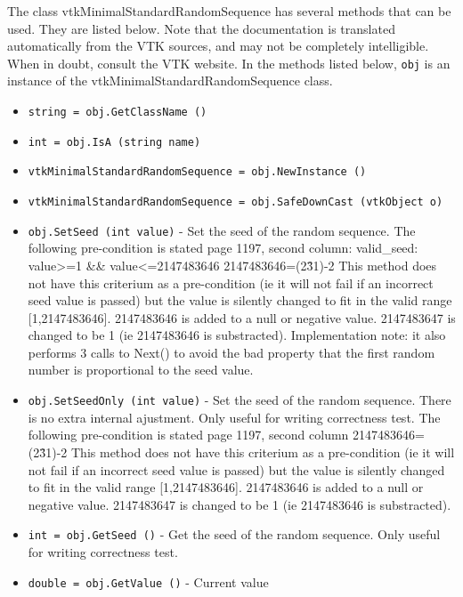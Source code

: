 The class vtkMinimalStandardRandomSequence has several methods that can be used.
  They are listed below.
Note that the documentation is translated automatically from the VTK sources,
and may not be completely intelligible.  When in doubt, consult the VTK website.
In the methods listed below, \verb|obj| is an instance of the vtkMinimalStandardRandomSequence class.
\begin{itemize}
\item  \verb|string = obj.GetClassName ()|

\item  \verb|int = obj.IsA (string name)|

\item  \verb|vtkMinimalStandardRandomSequence = obj.NewInstance ()|

\item  \verb|vtkMinimalStandardRandomSequence = obj.SafeDownCast (vtkObject o)|

\item  \verb|obj.SetSeed (int value)| -  Set the seed of the random sequence.
 The following pre-condition is stated page 1197, second column:
 valid\_seed: value>=1 \&\& value<=2147483646
 2147483646=(2\^31)-2
 This method does not have this criterium as a pre-condition (ie it will
 not fail if an incorrect seed value is passed) but the value is silently
 changed to fit in the valid range [1,2147483646].
 2147483646 is added to a null or negative value.
 2147483647 is changed to be 1 (ie 2147483646 is substracted).
 Implementation note: it also performs 3 calls to Next() to avoid the
 bad property that the first random number is proportional to the seed
 value.

\item  \verb|obj.SetSeedOnly (int value)| -  Set the seed of the random sequence. There is no extra internal
 ajustment. Only useful for writing correctness test.
 The following pre-condition is stated page 1197, second column
 2147483646=(2\^31)-2
 This method does not have this criterium as a pre-condition (ie it will
 not fail if an incorrect seed value is passed) but the value is silently
 changed to fit in the valid range [1,2147483646].
 2147483646 is added to a null or negative value.
 2147483647 is changed to be 1 (ie 2147483646 is substracted).

\item  \verb|int = obj.GetSeed ()| -  Get the seed of the random sequence.
 Only useful for writing correctness test.

\item  \verb|double = obj.GetValue ()| -  Current value
 


\end{itemize}
